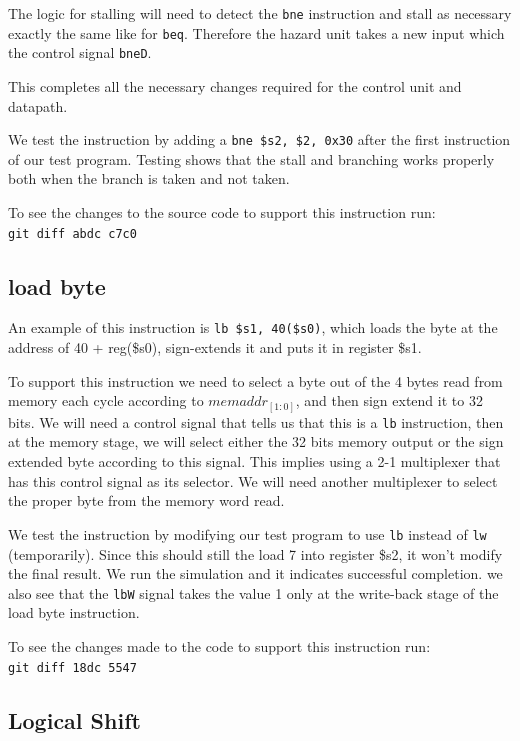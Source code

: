 \documentclass[titlepage,12pt,twoside,a4paper]{article}
\newcommand{\code}[1]{{\texttt{#1}}}
\begin{document}
The logic for stalling will need to detect the \code{bne} instruction and stall as necessary exactly the same like for \code{beq}. Therefore the hazard unit takes a new input which the control signal \code{bneD}.

This completes all the necessary changes required for the control unit and datapath.

We test the instruction by adding a \code{bne \$s2, \$2, 0x30} after the first instruction of our test program. Testing shows that the stall and branching works properly both when the branch is taken and not taken.

To see the changes to the source code to support this instruction run:\\
\code{git diff abdc c7c0}

\subsection{load byte}

An example of this instruction is \code{lb \$s1, 40(\$s0)}, which loads the byte at the address of 40 + reg(\$s0), sign-extends it and puts it in register \$s1.

To support this instruction we need to select a byte out of the 4 bytes read from memory each cycle according to $memaddr_{[1:0]}$, and then sign extend it to 32 bits. We will need a control signal that tells us that this is a \code{lb} instruction, then at the memory stage, we will select either the 32 bits memory output or the sign extended byte according to this signal. This implies using a 2-1 multiplexer that has this control signal as its selector. We will need another multiplexer to select the proper byte from the memory word read.

We test the instruction by modifying our test program to use \code{lb} instead of \code{lw} (temporarily). Since this should still the load 7 into register \$s2, it won't modify the final result. We run the simulation and it indicates successful completion. we also see that the \code{lbW} signal takes the value 1 only at the write-back stage of the load byte instruction.

To see the changes made to the code to support this instruction run:\\
\code{git diff 18dc 5547}

\subsection{Logical Shift}
\end{document}
